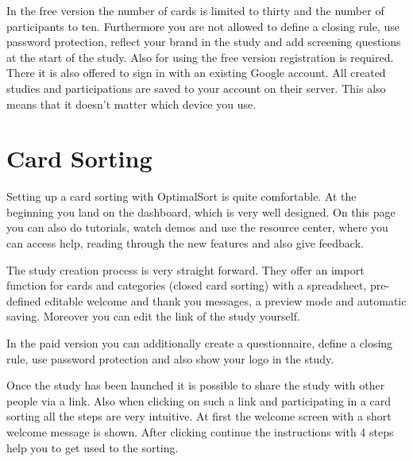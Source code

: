 In the free version the number of cards is limited to thirty and the number of participants to ten.
Furthermore you are not allowed to define a closing rule, use password protection, reflect your 
brand in the study and add screening questions at the start of the study. 
Also for using the free version registration is required. There it is also offered to sign in 
with an existing Google account. All created studies and participations are saved to your 
account on their server. This also means that it doesn't matter which device you use.


\section{Card Sorting}
Setting up a card sorting with OptimalSort is quite comfortable. At the beginning you land on the 
dashboard, which is very well designed. On this page you can also do tutorials, watch demos and 
use the resource center, where you can access help, reading through the new features and also
give feedback.

The study creation process is very straight forward. They offer an import function for cards and
categories (closed card sorting) with a spreadsheet, pre-defined editable welcome and thank you
messages, a preview mode and automatic saving. Moreover you can edit the link of the study
yourself. 

In the paid version you can additionally create a questionnaire, define a closing rule, use
password protection and also show your logo in the study.

Once the study has been launched it is possible to share the study with other people via a link. 
Also when clicking on such a link and participating in a card sorting all the steps are 
very intuitive. At first the welcome screen with a short welcome message is shown. After clicking 
continue the instructions with 4 steps help you to get used to the sorting. 

